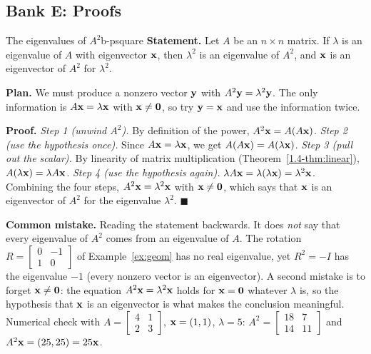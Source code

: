 \documentclass[11pt]{article}
\begin{document}
\subsection*{Bank E: Proofs}
\begin{exmp}{The eigenvalues of $A^2$}{b-psquare}
\textbf{Statement.} Let $A$ be an $n\times n$ matrix. If $\lambda$ is an eigenvalue of $A$ with eigenvector $\mathbf{x}$, then $\lambda^2$ is an eigenvalue of $A^2$, and $\mathbf{x}$ is an eigenvector of $A^2$ for $\lambda^2$.

\textbf{Plan.} We must produce a nonzero vector $\mathbf{y}$ with $A^2\mathbf{y}=\lambda^2\mathbf{y}$. The only information is $A\mathbf{x}=\lambda\mathbf{x}$ with $\mathbf{x}\neq\mathbf{0}$, so try $\mathbf{y}=\mathbf{x}$ and use the information twice.

\textbf{Proof.}
\emph{Step 1 (unwind $A^2$).} By definition of the power, $A^2\mathbf{x}=A(A\mathbf{x})$.
\emph{Step 2 (use the hypothesis once).} Since $A\mathbf{x}=\lambda\mathbf{x}$, we get $A(A\mathbf{x})=A(\lambda\mathbf{x})$.
\emph{Step 3 (pull out the scalar).} By linearity of matrix multiplication (Theorem~\ref{1.4-thm:linear}), $A(\lambda\mathbf{x})=\lambda A\mathbf{x}$.
\emph{Step 4 (use the hypothesis again).} $\lambda A\mathbf{x}=\lambda(\lambda\mathbf{x})=\lambda^2\mathbf{x}$.
Combining the four steps, $A^2\mathbf{x}=\lambda^2\mathbf{x}$ with $\mathbf{x}\neq\mathbf{0}$, which says that $\mathbf{x}$ is an eigenvector of $A^2$ for the eigenvalue $\lambda^2$. \qquad$\blacksquare$

\textbf{Common mistake.} Reading the statement backwards. It does \emph{not} say that every eigenvalue of $A^2$ comes from an eigenvalue of $A$. The rotation $R=\begin{bmatrix}0&-1\\1&0\end{bmatrix}$ of Example~\ref{ex:geom} has no real eigenvalue, yet $R^2=-I$ has the eigenvalue $-1$ (every nonzero vector is an eigenvector). A second mistake is to forget $\mathbf{x}\neq\mathbf{0}$: the equation $A^2\mathbf{x}=\lambda^2\mathbf{x}$ holds for $\mathbf{x}=\mathbf{0}$ whatever $\lambda$ is, so the hypothesis that $\mathbf{x}$ is an eigenvector is what makes the conclusion meaningful. Numerical check with $A=\begin{bmatrix}4&1\\2&3\end{bmatrix}$, $\mathbf{x}=(1,1)$, $\lambda=5$: $A^2=\begin{bmatrix}18&7\\14&11\end{bmatrix}$ and $A^2\mathbf{x}=(25,25)=25\mathbf{x}$.
\end{exmp}
\end{document}
